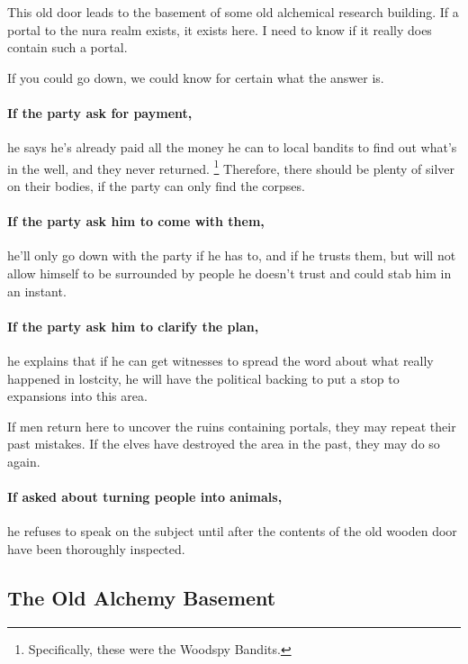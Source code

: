 \begin{multicols}{2}
\begin{speechtext}
  This old door leads to the basement of some old alchemical research building.
  If a portal to the nura realm exists, it exists here.
  I need to know if it really does contain such a portal.

  If you could go down, we could know for certain what the answer is.
\end{speechtext}

\paragraph{If the party ask for payment,}
he says he's already paid all the money he can to local bandits to find out what's in the well, and they never returned.%
\footnote{Specifically, these were the Woodspy Bandits.}
Therefore, there should be plenty of silver on their bodies, if the party can only find the corpses.

\paragraph{If the party ask him to come with them,}
he'll only go down with the party if he has to, and if he trusts them, but will not allow himself to be surrounded by people he doesn't trust and could stab him in an instant.

\forestpriest

\paragraph{If the party ask him to clarify the plan,}
he explains that if he can get witnesses to spread the word about what really happened in \gls{lostcity}, he will have the political backing to put a stop to expansions into this area.

If men return here to uncover the ruins containing portals, they may repeat their past mistakes.
If the elves have destroyed the area in the past, they may do so again.

\paragraph{If asked about turning people into animals,}
he refuses to speak on the subject until after the contents of the old wooden door have been thoroughly inspected.

\subsection{The Old Alchemy Basement}
\label{old_alchemy_basement}


\end{multicols}
